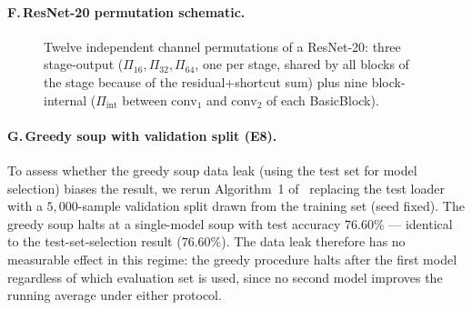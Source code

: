 \documentclass{article}
\begin{document}
\paragraph{F.\,ResNet-20 permutation schematic.}
\begin{figure}[h]
    \centering
{}
\caption{Twelve independent channel permutations of a ResNet-20: three stage-output ($\Pi_{16},\Pi_{32},\Pi_{64}$, one per stage, shared by all blocks of the stage because of the residual+shortcut sum) plus nine block-internal ($\Pi_{\text{int}}$ between $\mathrm{conv}_1$ and $\mathrm{conv}_2$ of each BasicBlock).}
\label{fig:perms}
\end{figure}

\paragraph{G.\,Greedy soup with validation split (E8).}
To assess whether the greedy soup data leak (using the test set for model selection) biases the result, we rerun Algorithm~1 of~\citet{wortsman2022soup} replacing the test loader with a $5{,}000$-sample validation split drawn from the training set (seed fixed). The greedy soup halts at a single-model soup with test accuracy $76.60\%$ — identical to the test-set-selection result ($76.60\%$). The data leak therefore has no measurable effect in this regime: the greedy procedure halts after the first model regardless of which evaluation set is used, since no second model improves the running average under either protocol.
\end{document}
